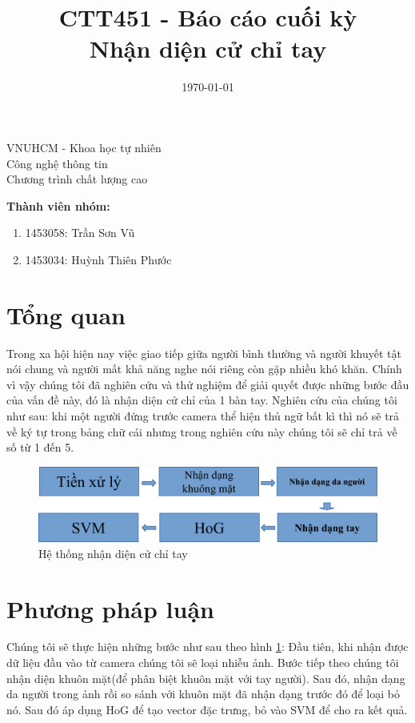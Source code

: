 \documentclass[a4paper, 12pt]{article}
\title{CTT451 - Báo cáo cuối kỳ \\ Nhận diện cử chỉ tay}
\date{\today}
\begin{document}
\begin{center} 
\large VNUHCM - Khoa học tự nhiên \\
Công nghệ thông tin \\
Chương trình chất lượng cao \\
\end{center}
\begingroup
\let\newpage\relax
\maketitle
\endgroup
\textbf{Thành viên nhóm:}
\begin{enumerate}
	\item 1453058: Trần Sơn Vũ
	\item 1453034: Huỳnh Thiên Phước
\end{enumerate}

\section{Tổng quan}
Trong xa hội hiện nay việc giao tiếp giữa người bình thường và người khuyết tật nói chung và người mất khả năng nghe nói riêng còn gặp nhiều khó khăn. Chính vì vậy chúng tôi đã nghiên cứu và thử nghiệm để giải quyết được những bước đầu của vấn đề này, đó là nhận diện cử chỉ của 1 bàn tay. Nghiên cứu của chúng tôi như sau: khi một người đứng trước camera thể hiện thủ ngữ bất kì thì nó sẽ trả về ký tự trong bảng chữ cái nhưng trong nghiên cứu này chúng tôi sẽ chỉ trả về số từ 1 đến 5.
\begin{figure}[!ht]
\includegraphics[width=\textwidth]{overview.png}
\caption{Hệ thống nhận diện cử chỉ tay}
\label{fig:overview}
\end{figure}
\section{Phương pháp luận}
Chúng tôi sẽ thực hiện những bước như sau theo hình \ref{fig:overview}: Đầu tiên, khi nhận được dữ liệu đầu vào từ camera chúng tôi sẽ loại nhiễu ảnh. Bước tiếp theo chúng tôi nhận diện khuôn mặt(để phân biệt khuôn mặt với tay người). Sau đó, nhận dạng da người trong ảnh rồi so sánh với khuôn mặt đã nhận dạng trước đó để loại bỏ nó. Sau đó áp dụng HoG để tạo vector đặc trưng, bỏ vào SVM để cho ra kết quả.
\end{document}
